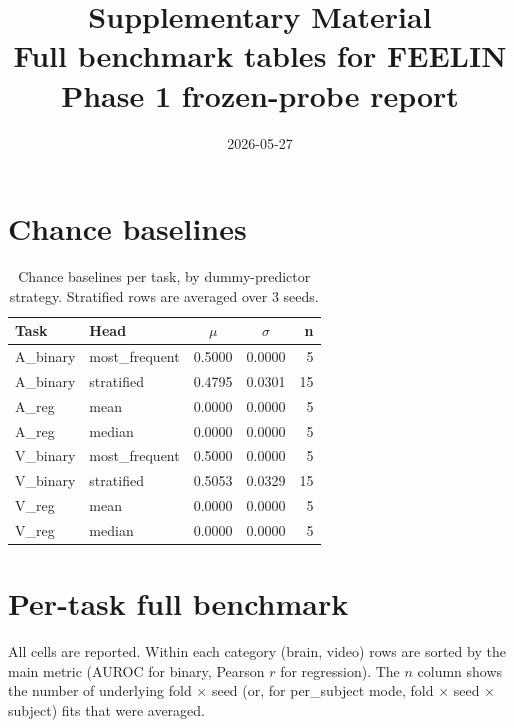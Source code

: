 \documentclass[10pt, a4paper, landscape]{article}
\title{\vspace{-2em}\textbf{Supplementary Material}\\
       \large Full benchmark tables for FEELIN Phase 1 frozen-probe report}
\author{}
\date{2026-05-27}
\begin{document}
\maketitle
\thispagestyle{fancy}

\section{Chance baselines}

\begin{table}[h]
\centering
\caption{Chance baselines per task, by dummy-predictor strategy. Stratified rows are averaged over 3 seeds.} \label{tab:chance}
\small
\begin{tabular}{l l S[table-format=1.4] S[table-format=1.4] r}
\toprule
Task & Head & {$\mu$} & {$\sigma$} & n \\
\midrule
A\_binary & most\_frequent & 0.5000 & 0.0000 & 5\\
A\_binary & stratified & 0.4795 & 0.0301 & 15\\
A\_reg & mean & 0.0000 & 0.0000 & 5\\
A\_reg & median & 0.0000 & 0.0000 & 5\\
V\_binary & most\_frequent & 0.5000 & 0.0000 & 5\\
V\_binary & stratified & 0.5053 & 0.0329 & 15\\
V\_reg & mean & 0.0000 & 0.0000 & 5\\
V\_reg & median & 0.0000 & 0.0000 & 5\\
\bottomrule
\end{tabular}
\end{table}

\section{Per-task full benchmark}
All cells are reported. Within each category (brain, video) rows are sorted by the main
metric (AUROC for binary, Pearson $r$ for regression). The $n$ column shows the number of
underlying fold $\times$ seed (or, for per\_subject mode, fold $\times$ seed $\times$ subject)
fits that were averaged.
\end{document}
